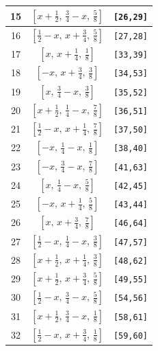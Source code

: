 \documentclass[fleqn,8pt]{jsarticle}
\begin{document}
\begin{longtable}{ccc}
15 & $\left[ x + \frac{1}{2},\, \frac{3}{4} - x,\, \frac{5}{8} \right]$ & {\tt [26,29]} \\ \hline
16 & $\left[ \frac{1}{2} - x,\, x + \frac{3}{4},\, \frac{5}{8} \right]$ & {\tt [27,28]} \\ \hline
17 & $\left[ x,\, x + \frac{1}{4},\, \frac{1}{8} \right]$ & {\tt [33,39]} \\ \hline
18 & $\left[ - x,\, x + \frac{3}{4},\, \frac{3}{8} \right]$ & {\tt [34,53]} \\ \hline
19 & $\left[ x,\, \frac{3}{4} - x,\, \frac{3}{8} \right]$ & {\tt [35,52]} \\ \hline
20 & $\left[ x + \frac{1}{2},\, \frac{1}{4} - x,\, \frac{7}{8} \right]$ & {\tt [36,51]} \\ \hline
21 & $\left[ \frac{1}{2} - x,\, x + \frac{1}{4},\, \frac{7}{8} \right]$ & {\tt [37,50]} \\ \hline
22 & $\left[ - x,\, \frac{1}{4} - x,\, \frac{1}{8} \right]$ & {\tt [38,40]} \\ \hline
23 & $\left[ - x,\, \frac{3}{4} - x,\, \frac{7}{8} \right]$ & {\tt [41,63]} \\ \hline
24 & $\left[ x,\, \frac{1}{4} - x,\, \frac{5}{8} \right]$ & {\tt [42,45]} \\ \hline
25 & $\left[ - x,\, x + \frac{1}{4},\, \frac{5}{8} \right]$ & {\tt [43,44]} \\ \hline
26 & $\left[ x,\, x + \frac{3}{4},\, \frac{7}{8} \right]$ & {\tt [46,64]} \\ \hline
27 & $\left[ \frac{1}{2} - x,\, \frac{1}{4} - x,\, \frac{3}{8} \right]$ & {\tt [47,57]} \\ \hline
28 & $\left[ x + \frac{1}{2},\, x + \frac{1}{4},\, \frac{3}{8} \right]$ & {\tt [48,62]} \\ \hline
29 & $\left[ x + \frac{1}{2},\, x + \frac{3}{4},\, \frac{5}{8} \right]$ & {\tt [49,55]} \\ \hline
30 & $\left[ \frac{1}{2} - x,\, \frac{3}{4} - x,\, \frac{5}{8} \right]$ & {\tt [54,56]} \\ \hline
31 & $\left[ x + \frac{1}{2},\, \frac{3}{4} - x,\, \frac{1}{8} \right]$ & {\tt [58,61]} \\ \hline
32 & $\left[ \frac{1}{2} - x,\, x + \frac{3}{4},\, \frac{1}{8} \right]$ & {\tt [59,60]} \\
\end{longtable}
\renewcommand{\arraystretch}{1.2}
\end{document}
